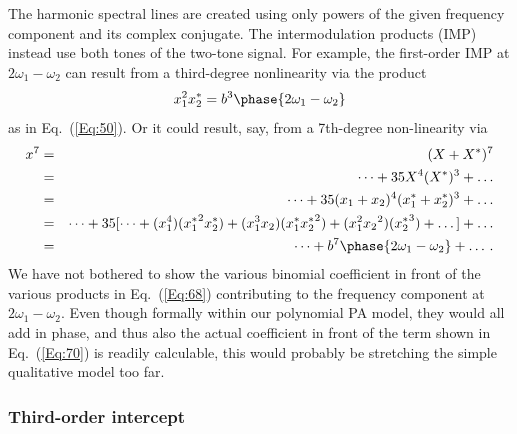 \documentclass[11pt,oneside,a4paper]{scrartcl}
\newcommand{\Eq}[1]{Eq.~(\ref{Eq:#1})}
\newcommand{\cc}[1]{\ensuremath{{#1}^*}}
\begin{document}
The harmonic spectral lines are created using only powers of the given frequency component and its complex conjugate. The intermodulation products (IMP) instead use both tones of the two-tone signal. For example, the first-order IMP at $2\omega_1-\omega_2$ can result from a third-degree nonlinearity via the product 
\[
	x_1^2 \cc x_2 = b^3 \phase{2\omega_1-\omega_2}
\]
as in \Eq{50}. Or it could result, say, from a 7th-degree non-linearity via
\begin{eqnarray}
	x^7 &=& (X + \cc X)^7 \nonumber \\
		&=&	\dots + 35 X^4 (\cc X)^3 + \dots \nonumber \\
		&=& \dots + 35 (x_1+x_2)^4(\cc x_1 + \cc x_2)^3 + \dots \nonumber \\
		&=& \dots 
			+ 35 [\dots+(x_1^4)({\cc x_1}^2 \cc x_2) 
			+ (x_1^3x_2)({\cc x_1} {\cc x_2}^2) 
			+ (x_1^2{x_2}^2)({\cc x_2}^3)+\dots] 
			+ \dots \label{Eq:68} \\
		&=& \dots + b^7 \phase{2\omega_1-\omega_2} + \dots \,. \label{Eq:70}
\end{eqnarray}
We have not bothered to show the various binomial coefficient in front of the various products in \Eq{68} contributing to the frequency component at $2\omega_1-\omega_2$. Even though formally within our polynomial PA model, they would all add in phase, and thus also the actual coefficient in front of the term shown in \Eq{70} is readily calculable, this would probably be stretching the simple qualitative model too far. 


\subsubsection*{Third-order intercept}
%
\end{document}
